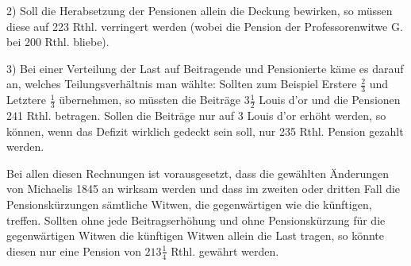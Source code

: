 2) Soll die Herabsetzung der Pensionen allein die Deckung bewirken, so müssen diese auf 223 Rthl. verringert werden (wobei die Pension der Professorenwitwe G. bei 200 Rthl. bliebe).

3) Bei einer Verteilung der Last auf Beitragende und Pensionierte käme es darauf an, welches Teilungsverhältnis man wählte: Sollten zum Beispiel Erstere \(\tfrac{2}{3}\) und Letztere \(\tfrac{1}{3}\) übernehmen, so müssten die Beiträge \(3\tfrac{1}{2}\) Louis d'or und die Pensionen 241 Rthl. betragen. Sollen die Beiträge nur auf 3 Louis d'or erhöht werden, so können, wenn das Defizit wirklich gedeckt sein soll, nur 235 Rthl. Pension gezahlt werden.

Bei allen diesen Rechnungen ist vorausgesetzt, dass die gewählten Änderungen von Michaelis 1845 an wirksam werden und dass im zweiten oder dritten Fall die Pensionskürzungen sämtliche Witwen, die gegenwärtigen wie die künftigen, treffen. Sollten ohne jede Beitragserhöhung und ohne Pensionskürzung für die gegenwärtigen Witwen die künftigen Witwen allein die Last tragen, so könnte diesen nur eine Pension von \(213\tfrac{1}{4}\) Rthl. gewährt werden.

